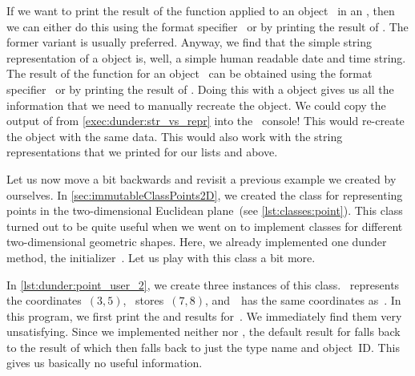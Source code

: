 If we want to print the result of the  function applied to an object~ in an , then we can either do this using the format specifier~ or by printing the result of .
The former variant is usually preferred.
Anyway, we find that the simple string representation of a  object is, well, a simple human readable date and time string.
The result of the function  for an object~ can be obtained using the format specifier~ or by printing the result of .
Doing this with a  object gives us all the information that we need to manually recreate the object.
We could copy the output of  from \cref{exec:dunder:str_vs_repr} into the \python\ console!
This would re-create the  object with the same data.
This would also work with the string representations that we printed for our lists  and  above.

%
%
Let us now move a bit backwards and revisit a previous example we created by ourselves.
In \cref{sec:immutableClassPoints2D}, we created the class  for representing points in the two-dimensional Euclidean plane~(see \cref{lst:classes:point}).
This class turned out to be quite useful when we went on to implement classes for different two-dimensional geometric shapes.
Here, we already implemented one dunder method, the initializer~.
Let us play with this class a bit more.

In \cref{lst:dunder:point_user_2}, we create three instances of this class.
~represents the coordinates~$(3,5)$, ~stores~$(7, 8)$, and~~has the same coordinates as~.
In this program, we first print the  and  results for~.
We immediately find them very unsatisfying.
Since we implemented neither  nor , the default result for  falls back to the result of  which then falls back to just the type name and object~ID.
This gives us basically no useful information.

